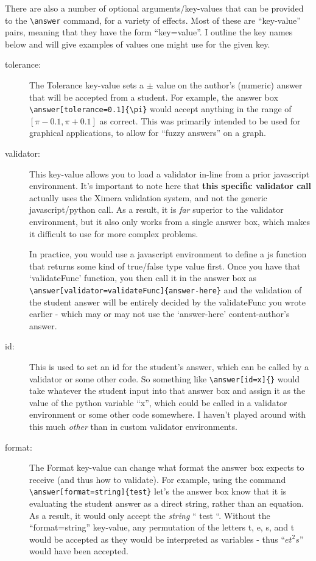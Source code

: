 \documentclass{ximera}
\begin{document}
There are also a number of optional arguments/key-values that can be provided
to the \verb|\answer| command, for a variety of effects. Most of these are
``key-value'' pairs, meaning that they have the form ``key=value''. I outline
the key names below and will give examples of values one might use for the
given key.

\begin{description}
  \item[tolerance:] The Tolerance key-value sets a $\pm$ value on the
    author's (numeric) answer that will be accepted from a student. For
    example,
    the answer box \verb|\answer[tolerance=0.1]{\pi}| would accept anything in
    the
    range of $[\pi-0.1,\pi+0.1]$ as correct. This was primarily intended to be
    used
    for graphical applications, to allow for ``fuzzy answers'' on a graph.

  \item[validator:] This key-value allows you to load a validator in-line
    from a prior javascript environment. It's important to note here that
    \textbf{this specific validator call} actually uses the Ximera validation
    system, and not the generic javascript/python call. As a result, it is
    \textit{far} superior to the validator environment, but it also only works
    from
    a single answer box, which makes it difficult to use for more complex
    problems.

    In practice, you would use a javascript environment to define a js function
    that returns some kind of true/false type value first. Once you have that
    `validateFunc' function, you then call it in the answer box as
    \verb|\answer[validator=validateFunc]{answer-here}| and the validation of
    the
    student answer will be entirely decided by the validateFunc you wrote
    earlier -
    which may or may not use the `answer-here' content-author's answer.

  \item[id:] This is used to set an id for the student's answer, which can be
    called by a validator or some other code. So something like
    \verb|\answer[id=x]{}| would take whatever the student input into that
    answer
    box and assign it as the value of the python variable ``x'', which could be
    called in a validator environment or some other code somewhere. I haven't
    played around with this much \textit{other} than in custom validator
    environments.

  \item[format:] The Format key-value can change what format the answer box
    expects to receive (and thus how to validate). For example, using the
    command
    \verb|\answer[format=string]{test}| let's the answer box know that it is
    evaluating the student answer as a direct string, rather than an equation.
    As a
    result, it would only accept the \textit{string} `` test ``. Without the
    ``format=string'' key-value, any permutation of the letters t, e, s, and t
    would be accepted as they would be interpreted as variables - thus
    ``$et^2s$''
    would have been accepted.


\end{description}
\end{document}
